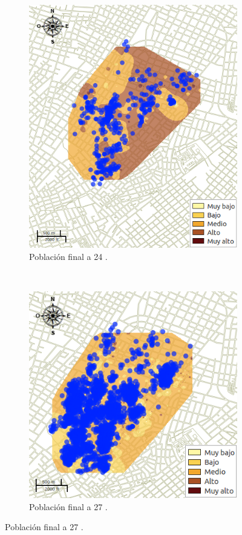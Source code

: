 \begin{figure}[!t]
    \begin{subfigure}[b]{0.225\textwidth}
        \includegraphics[width=\textwidth]{../book/capitulo-6/graphics/raster/temp-24-49.png}
        \caption{ Población final a 24 \textcelsius.}
    \end{subfigure}
    ~~~~
    \begin{subfigure}[b]{0.225\textwidth}
        \includegraphics[width=\textwidth]{../book/capitulo-6/graphics/raster/temp-27-49.png}
        \caption{ Población final a 27 \textcelsius.}
    \end{subfigure}


\end{figure}
